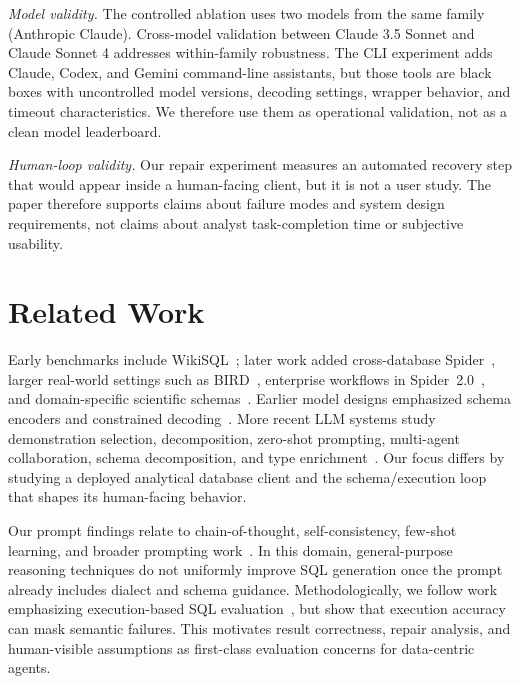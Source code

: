 \documentclass[sigconf, nonacm]{acmart}
\begin{document}
\emph{Model validity.} The controlled ablation uses two models from the same family (Anthropic Claude). Cross-model validation between Claude 3.5 Sonnet and Claude Sonnet 4 addresses within-family robustness. The CLI experiment adds Claude, Codex, and Gemini command-line assistants, but those tools are black boxes with uncontrolled model versions, decoding settings, wrapper behavior, and timeout characteristics. We therefore use them as operational validation, not as a clean model leaderboard.

\emph{Human-loop validity.} Our repair experiment measures an automated recovery step that would appear inside a human-facing client, but it is not a user study. The paper therefore supports claims about failure modes and system design requirements, not claims about analyst task-completion time or subjective usability.

\section{Related Work}
\label{sec:related}

Early benchmarks include WikiSQL~\cite{zhong2017seq2sql}; later work added cross-database Spider~\cite{yu2018spider}, larger real-world settings such as BIRD~\cite{li2024bird}, enterprise workflows in Spider~2.0~\cite{lei2024spider2}, and domain-specific scientific schemas~\cite{bayer2024science}. Earlier model designs emphasized schema encoders and constrained decoding~\cite{bogin2019gnn,wang2020ratsql,scholak2021picard}. More recent LLM systems study demonstration selection, decomposition, zero-shot prompting, multi-agent collaboration, schema decomposition, and type enrichment~\cite{gao2024dailsql,pourreza2024dinsql,dong2023c3,wang2024macsql,li2023resdsql,guo2021chase}. Our focus differs by studying a deployed analytical database client and the schema/execution loop that shapes its human-facing behavior.

Our prompt findings relate to chain-of-thought, self-consistency, few-shot learning, and broader prompting work~\cite{wei2022cot,wang2023selfconsistency,brown2020gpt3,liu2022incontext,liu2023prompting}. In this domain, general-purpose reasoning techniques do not uniformly improve SQL generation once the prompt already includes dialect and schema guidance. Methodologically, we follow work emphasizing execution-based SQL evaluation~\cite{li2024bird,rajkumar2022evaluating,katsogiannis2023survey}, but show that execution accuracy can mask semantic failures. This motivates result correctness, repair analysis, and human-visible assumptions as first-class evaluation concerns for data-centric agents.
\end{document}
